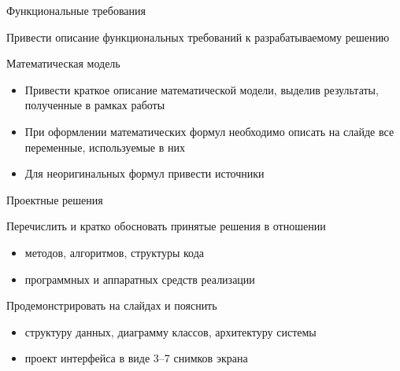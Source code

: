 \documentclass{../../cls/fefu_presentation}
\begin{document}
    \note{}

    \begin{frame}{Функциональные требования}
        \begin{block}{}
            Привести описание функциональных требований к разрабатываемому решению
        \end{block}
    \end{frame}

    \note{}

    \begin{frame}{Математическая модель}
        \begin{block}{}
            \begin{itemize}
                \item Привести краткое описание математической модели, выделив результаты, полученные в рамках работы
                \item При оформлении математических формул необходимо описать на слайде все переменные, используемые в них
                \item Для неоригинальных формул привести источники
            \end{itemize}
        \end{block}
    \end{frame}

    \note{}

    \begin{frame}{Проектные решения}
        \begin{block}{}
            Перечислить и кратко обосновать принятые решения в отношении
            \begin{itemize}
                \item методов, алгоритмов, структуры кода
                \item программных и аппаратных средств реализации
            \end{itemize}
        \end{block}
        \begin{block}{}
            Продемонстрировать на слайдах и пояснить
            \begin{itemize}
                \item структуру данных, диаграмму классов, архитектуру системы
                \item проект интерфейса в виде 3--7 снимков экрана
            \end{itemize}
        \end{block}
    \end{frame}
\end{document}
